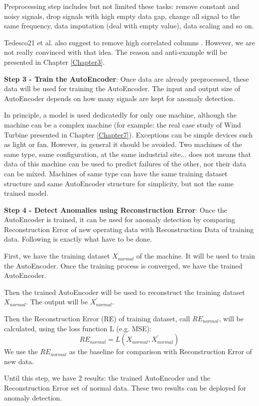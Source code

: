 Preprocessing step includes but not limited these tasks: remove constant and noisy signals, drop signals with high empty data gap, change all signal to the same frequency, data imputation (deal with empty value), data scaling and so on.

Tedesco21 et al. also suggest to remove high correlated columns \parencite{tedesco2021scalable}. However, we are not really convinced with that idea. The reason and anti-example will be presented in Chapter \ref{Chapter3}.

\textbf{Step 3 - Train the AutoEncoder}: Once data are already preprocessed, these data will be used for training the AutoEncoder. The input and output size of AutoEncoder depends on how many signals are kept for anomaly detection.

In principle, a model is used dedicatedly for only one machine, although the machine can be a complex machine (for example: the real case study of Wind Turbine presented in Chapter \ref{Chapter7}). 
Exceptions can be simple devices such as light or fan. However, in general it should be avoided. Two machines of the same type, same configuration, at the same industrial site... does not means that data of this machine can be used to predict failures of the other, nor their data can be mixed. Machines of same type can have the same training dataset structure and same AutoEncoder structure for simplicity, but not the same trained model.

\textbf{Step 4 - Detect Anomalies using Reconstruction Error}: Once the AutoEncoder is trained, it can be used for anomaly detection by comparing Reconstruction Error of new operating data with Reconstruction Data of training data. Following is exactly what have to be done.

First, we have the training dataset $X_{normal}$ of the machine. It will be used to train the AutoEncoder. Once the training process is converged, we have the trained AutoEncoder.

Then the trained AutoEncoder will be used to reconstruct the training dataset $X_{normal}$. The output will be $X_{normal}^{'}$.

Then the Reconstruction Error (RE) of training dataset, call $RE_{normal}$, will be calculated, using the loss function L (e.g. MSE):
\[ RE_{normal} = L(X_{normal}, X_{normal}^{'}) \]
We use the $RE_{normal}$ as the baseline for comparison with Reconstruction Error of new data.

Until this step, we have 2 results: the trained AutoEncoder and the Reconstruction Error set of normal data. These two results can be deployed for anomaly detection.

